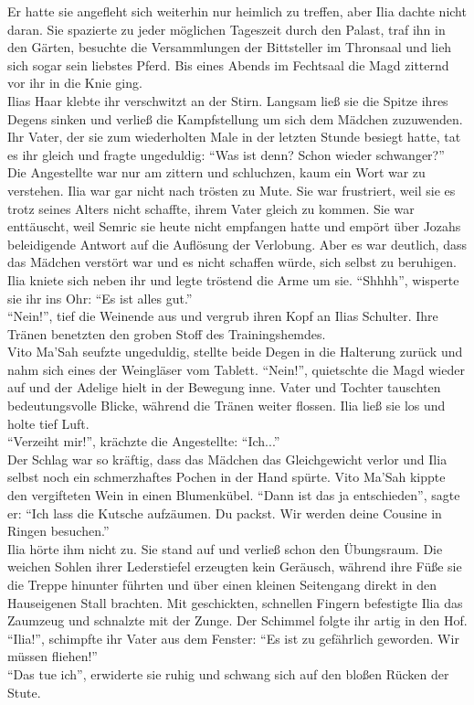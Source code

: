 Er hatte sie angefleht sich weiterhin nur heimlich zu treffen, aber Ilia dachte nicht daran. 
Sie spazierte zu jeder möglichen Tageszeit durch den Palast, traf ihn in den Gärten, besuchte 
die Versammlungen der Bittsteller im Thronsaal und lieh sich sogar sein liebstes Pferd. Bis eines 
Abends im Fechtsaal die Magd zitternd vor ihr in die Knie ging.\\
Ilias Haar klebte ihr verschwitzt an der Stirn. Langsam ließ sie die Spitze ihres Degens sinken und 
verließ die Kampfstellung um sich dem Mädchen zuzuwenden. Ihr Vater, der sie zum wiederholten Male 
in der letzten Stunde besiegt hatte, tat es ihr gleich und fragte ungeduldig: ``Was ist denn? Schon 
wieder schwanger?''\\
Die Angestellte war nur am zittern und schluchzen, kaum ein Wort war zu verstehen. Ilia war gar 
nicht nach trösten zu Mute. Sie war frustriert, weil sie es trotz seines Alters nicht schaffte, 
ihrem Vater gleich zu kommen. Sie war enttäuscht, weil Semric sie heute nicht empfangen hatte und 
empört über Jozahs beleidigende Antwort auf die Auflösung der Verlobung. Aber es war deutlich, dass 
das Mädchen verstört war und es nicht schaffen würde, sich selbst zu beruhigen. Ilia kniete sich 
neben ihr und legte tröstend die Arme um sie. ``Shhhh'', wisperte sie ihr ins Ohr: ``Es ist alles 
gut.''\\
``Nein!'', tief die Weinende aus und vergrub ihren Kopf an Ilias Schulter. Ihre Tränen benetzten 
den groben Stoff des Trainingshemdes.\\
Vito Ma'Sah seufzte ungeduldig, stellte beide Degen in die Halterung zurück und nahm sich eines der 
Weingläser vom Tablett. ``Nein!'', quietschte die Magd wieder auf und der Adelige hielt in der 
Bewegung inne. Vater und Tochter tauschten bedeutungsvolle Blicke, während die Tränen weiter 
flossen. Ilia ließ sie los und holte tief Luft.\\
``Verzeiht mir!'', krächzte die Angestellte: ``Ich...''\\
Der Schlag war so kräftig, dass das Mädchen das Gleichgewicht verlor und Ilia selbst noch ein 
schmerzhaftes Pochen in der Hand spürte. Vito Ma'Sah kippte den vergifteten Wein in einen 
Blumenkübel. ``Dann ist das ja entschieden'', sagte er: ``Ich lass die Kutsche aufzäumen. Du 
packst. Wir werden deine Cousine in Ringen besuchen.''\\
Ilia hörte ihm nicht zu. Sie stand auf und verließ schon den Übungsraum. Die weichen Sohlen ihrer 
Lederstiefel erzeugten kein Geräusch, während ihre Füße sie die Treppe hinunter führten und über 
einen kleinen Seitengang direkt in den Hauseigenen Stall brachten. Mit geschickten, schnellen 
Fingern befestigte Ilia das Zaumzeug und schnalzte mit der Zunge. Der Schimmel folgte ihr artig in 
den Hof.\\
``Ilia!'', schimpfte ihr Vater aus dem Fenster: ``Es ist zu gefährlich geworden. Wir müssen 
fliehen!''\\
``Das tue ich'', erwiderte sie ruhig und schwang sich auf den bloßen Rücken der Stute.\\

